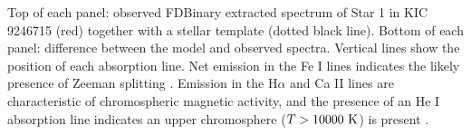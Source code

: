 \label{fig:emission1} Top of each panel: observed FDBinary extracted spectrum of Star 1 in KIC 9246715 (red) together with a stellar template (dotted black line). Bottom of each panel: difference between the model and observed spectra. Vertical lines show the position of each absorption line. Net emission in the Fe I lines indicates the likely presence of Zeeman splitting \citep{har73}. Emission in the H$\alpha$ and Ca II lines are characteristic of chromospheric magnetic activity, and the presence of an He I absorption line indicates an upper chromosphere ($T > 10000 \ \rm{K}$) is present \citep{fro12}.
  